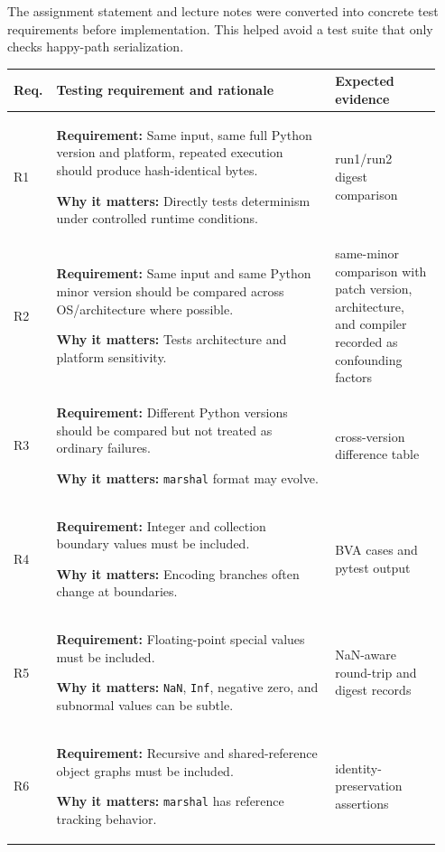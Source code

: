 \documentclass[10pt,a4paper]{article}
\begin{document}
The assignment statement and lecture notes were converted into concrete test requirements before implementation. This helped avoid a test suite that only checks happy-path serialization.

\begingroup
\small
\setlength{\tabcolsep}{5pt}
\renewcommand{\arraystretch}{1.18}

\begin{longtable}{@{}L{0.07\linewidth}L{0.63\linewidth}L{0.24\linewidth}@{}}
\toprule
\textbf{Req.} & \textbf{Testing requirement and rationale} & \textbf{Expected evidence} \\
\midrule

R1 &
\textbf{Requirement:} Same input, same full Python version and platform, repeated execution should produce hash-identical bytes.

\textbf{Why it matters:} Directly tests determinism under controlled runtime conditions. &
run1/run2 digest comparison \\

R2 &
\textbf{Requirement:} Same input and same Python minor version should be compared across OS/architecture where possible.

\textbf{Why it matters:} Tests architecture and platform sensitivity. &
same-minor comparison with patch version, architecture, and compiler recorded as confounding factors \\

R3 &
\textbf{Requirement:} Different Python versions should be compared but not treated as ordinary failures.

\textbf{Why it matters:} \texttt{marshal} format may evolve. &
cross-version difference table \\

R4 &
\textbf{Requirement:} Integer and collection boundary values must be included.

\textbf{Why it matters:} Encoding branches often change at boundaries. &
BVA cases and pytest output \\

R5 &
\textbf{Requirement:} Floating-point special values must be included.

\textbf{Why it matters:} \texttt{NaN}, \texttt{Inf}, negative zero, and subnormal values can be subtle. &
NaN-aware round-trip and digest records \\

R6 &
\textbf{Requirement:} Recursive and shared-reference object graphs must be included.

\textbf{Why it matters:} \texttt{marshal} has reference tracking behavior. &
identity-preservation assertions \\


\end{longtable}
\end{document}
